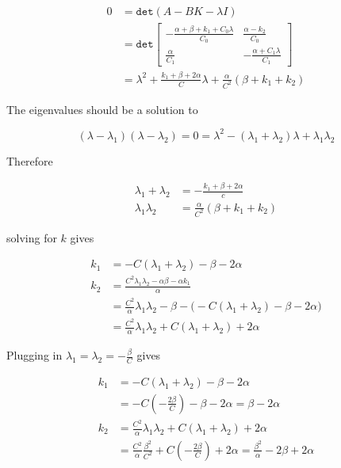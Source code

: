 \documentclass[11pt]{article}
\theoremstyle{definition}
\begin{document}
\begin{enumerate}
\begin{enumerate}
        \begin{align*}
            0 &= \mathtt{det} (A - BK - \lambda I) \\
            &= \mathtt{det}
            \begin{bmatrix}
                -\frac{\alpha + \beta + k_1 + C_0 \lambda}{C_0} & \frac{\alpha - k_2}{C_0} \\
                \frac{\alpha}{C_1} & - \frac{\alpha + C_1 \lambda}{C_1}
            \end{bmatrix} \\
            &= \lambda^2 + \frac{k_1 + \beta + 2 \alpha}{C} \lambda + \frac{\alpha}{C^2} (\beta + k_1 + k_2)
        \end{align*}

        The eigenvalues should be a solution to

        $$ (\lambda - \lambda_1)(\lambda - \lambda_2) = 0 = \lambda^2 - (\lambda_1 + \lambda_2) \lambda + \lambda_1 \lambda_2 $$

        Therefore

        \begin{align*}
            \lambda_1 + \lambda_2 &= -\frac{k_1 + \beta + 2\alpha}{c} \\
            \lambda_1 \lambda_2 &= \frac{\alpha}{C^2} (\beta + k_1 + k_2)
        \end{align*}

        solving for $k$ gives

        \begin{align*}
            k_1 &= -C(\lambda_1 + \lambda_2) - \beta - 2\alpha \\
            k_2 &= \frac{C^2 \lambda_1 \lambda_2 - \alpha\beta - \alpha k_1}{\alpha} \\
             &= \frac{C^2}{\alpha} \lambda_1 \lambda_2 - \beta - \big( -C(\lambda_1 + \lambda_2) - \beta - 2\alpha  \big) \\
             &= \frac{C^2}{\alpha} \lambda_1 \lambda_2 + C(\lambda_1 + \lambda_2) + 2\alpha
        \end{align*}

        Plugging in $\lambda_1 = \lambda_2 = -\frac{\beta}{C}$ gives

        \begin{align*}
            k_1 &= -C(\lambda_1 + \lambda_2) - \beta - 2\alpha \\
             &= -C(-\frac{2\beta}{C}) - \beta - 2\alpha = \beta - 2\alpha \\
            k_2 &= \frac{C^2}{\alpha} \lambda_1 \lambda_2 + C(\lambda_1 + \lambda_2) + 2\alpha \\
             &= \frac{C^2}{\alpha} \frac{\beta^2}{C^2} + C(-\frac{2\beta}{C}) + 2\alpha = \frac{\beta^2}{\alpha} - 2\beta + 2\alpha
        \end{align*}


\end{enumerate}
\end{enumerate}
\end{document}
